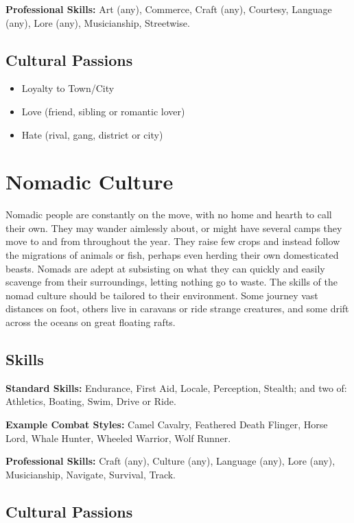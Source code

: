 \documentclass[10pt]{article}
\begin{document}
\textbf{Professional Skills:} Art (any), Commerce, Craft (any), Courtesy, Language (any), Lore (any), Musicianship, Streetwise.

\subsection{Cultural Passions}
\label{sec:civilised-passions}

\begin{itemize}
    \item Loyalty to Town/City
    \item Love (friend, sibling or romantic lover)
    \item Hate (rival, gang, district or city)
\end{itemize}

\section{Nomadic Culture}
\label{sec:nomadic}

Nomadic people are constantly on the move, with no home and hearth to call their own. They may wander aimlessly about, or might have several camps they move to and from throughout the year. They raise few crops and instead follow the migrations of animals or fish, perhaps even herding their own domesticated beasts. Nomads are adept at subsisting on what they can quickly and easily scavenge from their surroundings, letting nothing go to waste. The skills of the nomad culture should be tailored to their environment. Some journey vast distances on foot, others live in caravans or ride strange creatures, and some drift across the oceans on great floating rafts.


\subsection{Skills}
\label{sec:nomadic-skills}

\textbf{Standard Skills:} Endurance, First Aid, Locale, Perception, Stealth; and two of: Athletics, Boating, Swim, Drive or Ride.

\textbf{Example Combat Styles:} Camel Cavalry, Feathered Death Flinger, Horse Lord, Whale Hunter, Wheeled Warrior, Wolf Runner.

\textbf{Professional Skills:} Craft (any), Culture (any), Language (any), Lore (any), Musicianship, Navigate, Survival, Track.

\subsection{Cultural Passions}
\label{sec:nomadic-passions}
\end{document}

